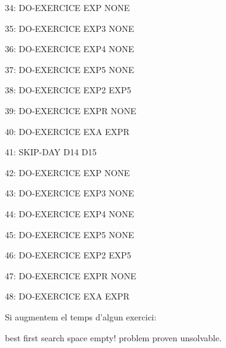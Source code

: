 \documentclass[a4paper,12pt, UTF-8]{article}
\begin{document}
    34: DO-EXERCICE EXP NONE
    
    35: DO-EXERCICE EXP3 NONE
    
    36: DO-EXERCICE EXP4 NONE
    
    37: DO-EXERCICE EXP5 NONE
    
    38: DO-EXERCICE EXP2 EXP5
    
    39: DO-EXERCICE EXPR NONE
    
    40: DO-EXERCICE EXA EXPR
    
    41: SKIP-DAY D14 D15
    
    42: DO-EXERCICE EXP NONE
    
    43: DO-EXERCICE EXP3 NONE
    
    44: DO-EXERCICE EXP4 NONE
    
    45: DO-EXERCICE EXP5 NONE
    
    46: DO-EXERCICE EXP2 EXP5
    
    47: DO-EXERCICE EXPR NONE
    
    48: DO-EXERCICE EXA EXPR

\setlength{\parskip}{0.7em}


Si augmentem el temps d'algun exercici:

best first search space empty! problem proven unsolvable.
\end{document}

